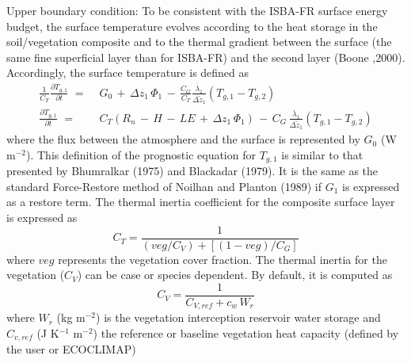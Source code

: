 Upper boundary condition: 
%
To be consistent with the ISBA-FR surface energy budget, the surface
temperature evolves according to the heat storage in the
soil/vegetation composite and to the thermal gradient between the
surface (the same fine superficial layer than for ISBA-FR) and the
second layer (Boone \etal ,2000\nocite{Boone2000}).
Accordingly, the surface temperature is defined as
%
\begin{subequations}
\begin{align}
%
\label{eq:tsfc}
\frac{1}{C_T} \frac{\partial T_{g,1}}{\partial t} \,\,=&\,\,
G_0 \,+\, \Delta z_1 \,\Phi_1 \,-\, \frac{C_G}{C_T}
\frac{{\overline\lambda}_1}{\Delta {\tilde z}_1}\left(
  T_{g,1} - T_{g,2}\right) \\
%
\label{eq:tsfc_b}
\frac{\partial T_{g,1}}{\partial t} \,\,=&\,\,
C_T \left( R_n \,-\, H \,-\, LE \,+\, \Delta z_1 \,\Phi_1 \right) \,-\, 
C_G \, \frac{{\overline\lambda}_1}{\Delta {\tilde z}_1}
\left( T_{g,1} - T_{g,2}\right) 
%
\end{align}
\end{subequations}
%
where the
flux between the atmosphere and the surface
is represented by $G_0$ (W m$^{-2}$).
This definition of the prognostic equation for $T_{g,1}$
is similar to that presented by
Bhumralkar (1975)\nocite{Bhumralkar1975} and Blackadar (1979)\nocite{Blackadar1976}. It is the same as
the standard Force-Restore method of Noilhan and Planton (1989)\nocite{Noilhan1989}
if $G_1$ is expressed as a restore term.
The thermal inertia coefficient for the composite surface
layer is expressed as
%
%
\begin{equation}
C_T = {\frac{1}{\left(veg/C_V\right)+\left[(1-veg)/C_G\right]}}
\end{equation}
%
%
where $veg$ represents the vegetation cover fraction.
The thermal inertia for the vegetation ($C_V$) can
be case or species dependent. By default, it is computed as
%
\begin{equation}
C_V = \frac{1}{C_{V,ref} + c_w\,W_r}
\end{equation}
%
where $W_r$ (kg m$^{-2}$) is the vegetation interception 
reservoir water storage
and $C_{v,ref}$ (J K$^{-1}$ m$^{-2}$) the reference or baseline
vegetation heat capacity (defined by the user or ECOCLIMAP)
